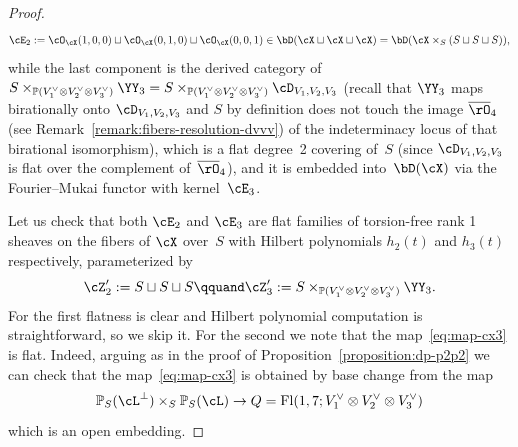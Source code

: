 \documentclass[11pt]{amsart}
\renewcommand{\P}{{\mathbb{P}}}
\DeclareMathOperator{\Fl}{\mathrm{Fl}}
\theoremstyle{plain}
\theoremstyle{definition}
\theoremstyle{remark}
\begin{document}
\begin{proof}
\begin{equation*}
\cE_2 := \cO_\cX(1,0,0) \sqcup \cO_\cX(0,1,0) \sqcup \cO_\cX(0,0,1) \in \bD(\cX \sqcup \cX \sqcup \cX) = \bD(\cX \times_S (S \sqcup S \sqcup S)),
\end{equation*}
while the last component is the derived category 
of~$S \times_{\P(V_1^\vee \otimes V_2^\vee \otimes V_3^\vee)} \YY_3 = 
S \times_{\P(V_1^\vee \otimes V_2^\vee \otimes V_3^\vee)} {\cD_{V_1,V_2,V_3}}$
(recall that $\YY_3$ maps birationally onto ${\cD_{V_1,V_2,V_3}}$ and $S$ by definition 
does not touch the image $\overline\rO_4$ (see Remark~\ref{remark:fibers-resolution-dvvv}) 
of the indeterminacy locus of that birational isomorphism),
which is a flat degree~2 covering of~$S$ (since ${\cD_{V_1,V_2,V_3}}$ is flat over the complement of~$\overline\rO_4$), 
and it is embedded into~$\bD(\cX)$ via the Fourier--Mukai functor with kernel~$\cE_3$.

Let us check that both $\cE_2$ and $\cE_3$ are flat families of torsion-free rank 1 sheaves on the fibers of $\cX$ over~$S$ with Hilbert polynomials $h_2(t)$ and $h_3(t)$ respectively, parameterized by 
\begin{equation*}
\cZ'_2 := S \sqcup S \sqcup S
\qquand
\cZ'_3 := S \times_{\P(V_1^\vee \otimes V_2^\vee \otimes V_3^\vee)} \YY_3.
\end{equation*}
For the first flatness is clear and Hilbert polynomial computation is straightforward, so we skip it.
For the second we note that the map~\eqref{eq:map-cx3} is flat.
Indeed, arguing as in the proof of Proposition~\ref{proposition:dp-p2p2} we can check
that the map~\eqref{eq:map-cx3} is obtained by base change from the map 
\begin{equation*}
\P_S(\cL^\perp) \times_S \P_S(\cL) \to Q = \Fl(1,7;V_1^\vee \otimes V_2^\vee \otimes V_3^\vee) 
\end{equation*}
which is an open embedding.


\end{proof}
\end{document}
